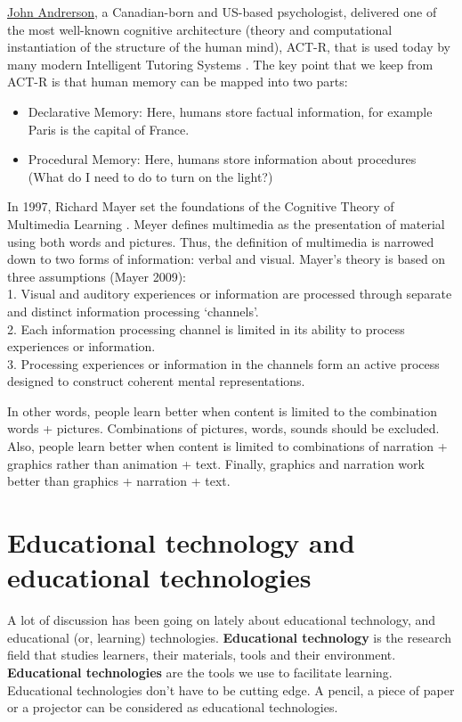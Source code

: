 \documentclass[
]{book}
\providecommand{\tightlist}{%
  \setlength{\itemsep}{0pt}\setlength{\parskip}{0pt}}
\begin{document}
\href{https://en.wikipedia.org/wiki/John_Robert_Anderson_(psychologist)}{John Andrerson}, a Canadian-born and US-based psychologist, delivered one of the most well-known cognitive architecture (theory and computational instantiation of the structure of the human mind), ACT-R, that is used today by many modern Intelligent Tutoring Systems \citep{anderson2013architecture}. The key point that we keep from ACT-R is that human memory can be mapped into two parts:

\begin{itemize}
\tightlist
\item
  Declarative Memory: Here, humans store factual information, for example Paris is the capital of France.
\item
  Procedural Memory: Here, humans store information about procedures (What do I need to do to turn on the light?)
\end{itemize}

In 1997, Richard Mayer set the foundations of the Cognitive Theory of Multimedia Learning \citep{mayer1997multimedia}. Meyer defines multimedia as the presentation of material using both words and pictures. Thus, the definition of multimedia is narrowed down to two forms of information: verbal and visual. Mayer's theory is based on three assumptions (Mayer 2009):\\
1. Visual and auditory experiences or information are processed through separate and distinct information processing `channels'.\\
2. Each information processing channel is limited in its ability to process experiences or information.\\
3. Processing experiences or information in the channels form an active process designed to construct coherent mental representations.

In other words, people learn better when content is limited to the combination words + pictures. Combinations of pictures, words, sounds should be excluded. Also, people learn better when content is limited to combinations of narration + graphics rather than animation + text. Finally, graphics and narration work better than graphics + narration + text.

\section{Educational technology and educational technologies}\label{educational-technology-and-educational-technologies}

A lot of discussion has been going on lately about educational technology, and educational (or, learning) technologies. \textbf{Educational technology} is the research field that studies learners, their materials, tools and their environment.
\textbf{Educational technologies} are the tools we use to facilitate learning. Educational technologies don't have to be cutting edge. A pencil, a piece of paper or a projector can be considered as educational technologies.
\end{document}
